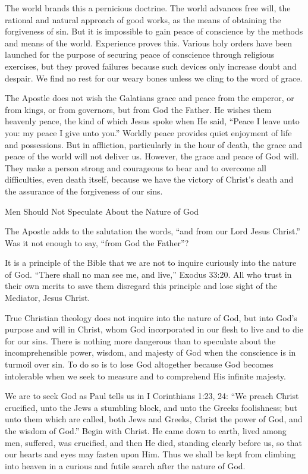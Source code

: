 The world brands this a pernicious doctrine. The world advances free will, the rational and natural approach of good works, as the means of obtaining the forgiveness of sin. But it is impossible to gain peace of conscience by the methods and means of the world. Experience proves this. Various holy orders have been launched for the purpose of securing peace of conscience through religious exercises, but they proved failures because such devices only increase doubt and despair. We find no rest for our weary bones unless we cling to the word of grace.

The Apostle does not wish the Galatians grace and peace from the emperor, or from kings, or from governors, but from God the Father. He wishes them heavenly peace, the kind of which Jesus spoke when He said, “Peace I leave unto you: my peace I give unto you.” Worldly peace provides quiet enjoyment of life and possessions. But in affliction, particularly in the hour of death, the grace and peace of the world will not deliver us. However, the grace and peace of God will. They make a person strong and courageous to bear and to overcome all difficulties, even death itself, because we have the victory of Christ’s death and the assurance of the forgiveness of our sins.

Men Should Not Speculate About the Nature of God

The Apostle adds to the salutation the words, “and from our Lord Jesus Christ.” Was it not enough to say, “from God the Father”?

It is a principle of the Bible that we are not to inquire curiously into the nature of God. “There shall no man see me, and live,” Exodus 33:20. All who trust in their own merits to save them disregard this principle and lose sight of the Mediator, Jesus Christ.

True Christian theology does not inquire into the nature of God, but into God’s purpose and will in Christ, whom God incorporated in our flesh to live and to die for our sins. There is nothing more dangerous than to speculate about the incomprehensible power, wisdom, and majesty of God when the conscience is in turmoil over sin. To do so is to lose God altogether because God becomes intolerable when we seek to measure and to comprehend His infinite majesty.

We are to seek God as Paul tells us in I Corinthians 1:23, 24: “We preach Christ crucified, unto the Jews a stumbling block, and unto the Greeks foolishness; but unto them which are called, both Jews and Greeks, Christ the power of God, and the wisdom of God.” Begin with Christ. He came down to earth, lived among men, suffered, was crucified, and then He died, standing clearly before us, so that our hearts and eyes may fasten upon Him. Thus we shall be kept from climbing into heaven in a curious and futile search after the nature of God.

